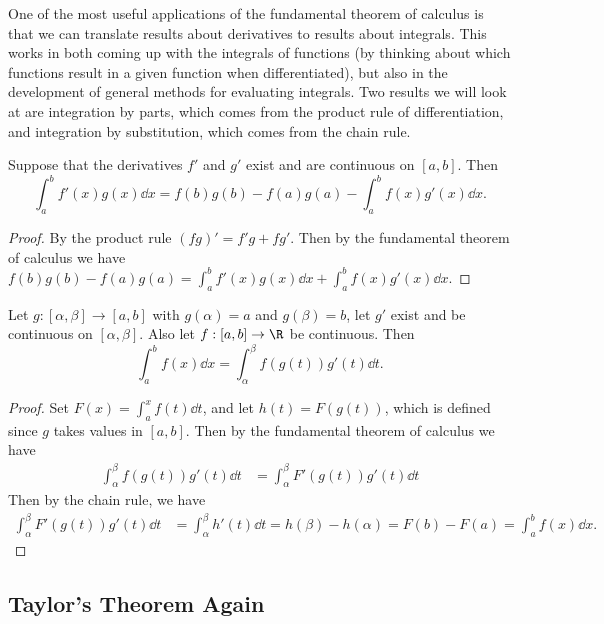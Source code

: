 \documentclass[a4paper]{scrartcl}
\begin{document}
One of the most useful applications of the fundamental theorem of calculus is that we can translate results about derivatives to results about integrals. This works in both coming up with the integrals of functions (by thinking about which functions result in a given function when differentiated), but also in the development of general methods for evaluating integrals. Two results we will look at are integration by parts, which comes from the product rule of differentiation, and integration by substitution, which comes from the chain rule.

\begin{corollary}
	Suppose that the derivatives $f'$ and $g'$ exist and are continuous on $[a, b]$. Then
	$$
	\int_a^b f'(x)g(x) \dd x = f(b)g(b) - f(a)g(a) - \int_a^b f(x)g'(x) \dd x.
	$$
\end{corollary}
\begin{proof}
	By the product rule $(fg)' = f'g + fg'$. Then by the fundamental theorem of calculus we have
	$
	f(b)g(b) - f(a)g(a) = \int_a^b f'(x)g(x) \dd x + \int_a^b f(x) g'(x) \dd x.
 	$
\end{proof}

\begin{corollary}
	Let $g:[\alpha, \beta] \rightarrow [a, b]$ with $g(\alpha) = a$ and $g(\beta) = b$, let $g'$ exist and be continuous on $[\alpha, \beta]$. Also let $f:[a, b] \rightarrow \R$ be continuous. Then
	$$
	\int_a^b f(x) \dd x = \int_{\alpha}^{\beta} f(g(t)) g'(t) \dd t.
	$$
\end{corollary}
\begin{proof}
	Set $F(x) = \int_a^x f(t) \dd t$, and let $h(t) = F(g(t))$, which is defined since $g$ takes values in $[a, b]$. Then by the fundamental theorem of calculus we have
	\begin{align*}
		\int_{\alpha}^{\beta} f(g(t)) g'(t) \dd t &= \int_{\alpha}^{\beta} F'(g(t)) g'(t) \dd t
	\end{align*}
	Then by the chain rule, we have
	\begin{align*}
		\int_{\alpha}^{\beta} F'(g(t)) g'(t) \dd t &= \int_{\alpha}^{\beta} h'(t) \dd t = h(\beta) - h(\alpha) = F(b) - F(a) = \int_a^b f(x) \dd x.
	\end{align*}
\end{proof}

\subsection{Taylor's Theorem Again}
\end{document}
